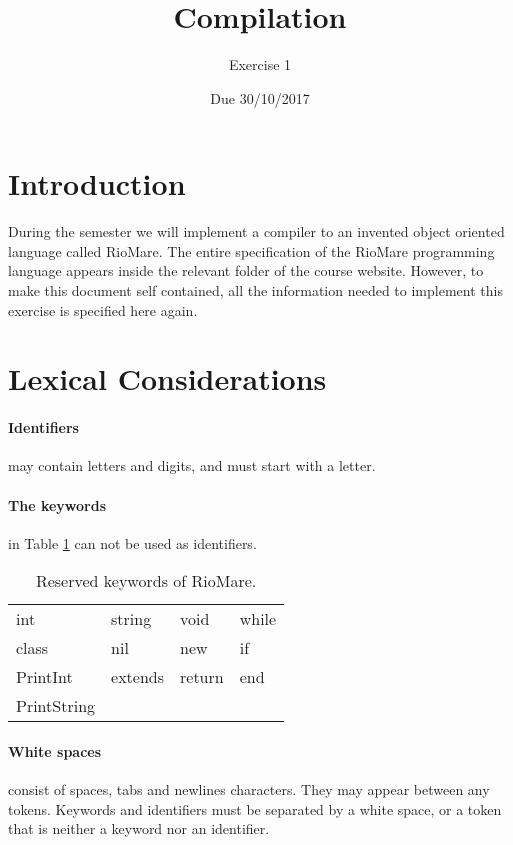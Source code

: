 \documentclass{article}
\begin{document}
\title{Compilation}
\author{Exercise 1}
\date{Due 30/10/2017}
\maketitle

\section{Introduction}
During the semester we will implement a compiler to an invented
object oriented language called RioMare.
The entire specification of the RioMare programming language
appears inside the relevant folder of the course website.
However, to make this document self contained,
all the information needed to implement this exercise is specified here again.

\section{Lexical Considerations}
\paragraph{Identifiers} may contain letters and digits, and must start with a letter.
\paragraph{The keywords} in Table \ref{Table_Reserved_Keywords_of_RioMare} can not
be used as identifiers.
\begin{table}[h]
\centering
\begin{tabular}{ l l l l}
  int         & string  & void   & while \\
  class       & nil     & new    & if    \\
  PrintInt    & extends & return & end   \\
  PrintString &         &        &       \\
\end{tabular}
\caption{
Reserved keywords of RioMare.
\label{Table_Reserved_Keywords_of_RioMare}}
\end{table}
\paragraph{White spaces} consist of spaces, tabs and newlines
characters. They may appear between any tokens.
Keywords and identifiers must be separated by a white space,
or a token that is neither a keyword nor an identifier.
\end{document}
